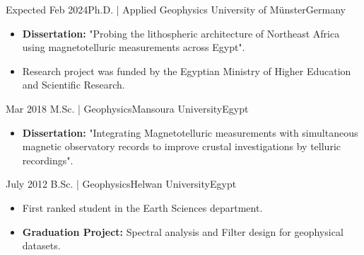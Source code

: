 

\begin{experiences}
	\experience
	{Expected \vfill\hfill Feb 2024}{Ph.D. | Applied Geophysics}{ University of Münster}{Germany}
	{} {
		\begin{itemize}
			\item \textbf{Dissertation:} "Probing the lithospheric architecture of Northeast Africa using magnetotelluric measurements across Egypt".
			\item Research project was funded by the Egyptian Ministry of Higher Education and Scientific Research.
		\end{itemize}
	}
	{}
	\emptySeparator
	\experience
	{Mar 2018}   {M.Sc. | Geophysics}{Mansoura University}{Egypt}
	{} {
		\begin{itemize}
			\item \textbf{Dissertation:} "Integrating Magnetotelluric measurements with simultaneous magnetic observatory records to improve crustal investigations by telluric recordings".
		\end{itemize}
	}
	{}
	\emptySeparator
	\experience
	{July 2012}   {B.Sc. | Geophysics}{Helwan University}{Egypt}
	{} {
		\begin{itemize}
			\item First ranked student in the Earth Sciences department.
			\item \textbf{Graduation Project:}  Spectral analysis and Filter design for geophysical datasets.
		\end{itemize}
	}
	{}
\end{experiences}